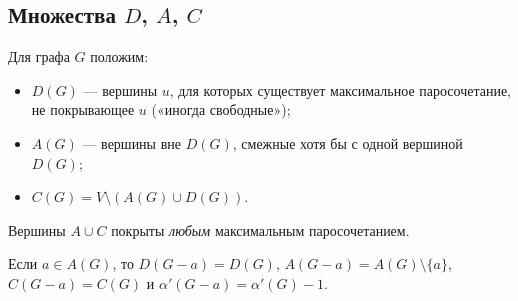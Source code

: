 \subsection*{Множества \(D\), \(A\), \(C\)}
\begin{definition}
Для графа \(G\) положим:
\begin{itemize}\tightlist
\item \(D(G)\) — вершины \(u\), для которых существует максимальное паросочетание,
  не покрывающее \(u\) («иногда свободные»);
\item \(A(G)\) — вершины вне \(D(G)\), смежные хотя бы с одной вершиной \(D(G)\);
\item \(C(G)=V\setminus(A(G)\cup D(G))\).
\end{itemize}
\end{definition}
Вершины \(A\cup C\) покрыты \emph{любым} максимальным паросочетанием.
\begin{lemma}\label{lem:stability}
Если \(a\in A(G)\), то \(D(G-a)=D(G)\), \(A(G-a)=A(G)\setminus\{a\}\), \(C(G-a)=C(G)\)
и \(\alpha'(G-a)=\alpha'(G)-1\).
\end{lemma}
